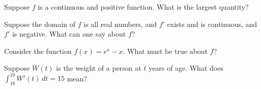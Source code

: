 \documentclass{ximera}
\begin{document}


\begin{problem}
  Suppose $f$ is a continuous and positive function.  What is the largest quantity?
  \begin{multipleChoice}
  \end{multipleChoice}
\end{problem}




\begin{problem}
  Suppose the domain of $f$ is all real numbers, and $f'$ exists and is continuous, and $f'$ is negative.  What can one say about $f$?
  \begin{multipleChoice}
  \end{multipleChoice}
\end{problem}

\begin{problem}
  Consider the function $f(x) = e^x - x$.  What must be true about $f$?
  \begin{multipleChoice}
  \end{multipleChoice}
\end{problem}

\begin{problem}
  Suppose $W(t)$ is the weight of a person at $t$ years of age.  What does $\int_{18}^{19} W'(t) \, dt = 15$ mean?
  \begin{multipleChoice}
  \end{multipleChoice}
\end{problem}
\end{document}
